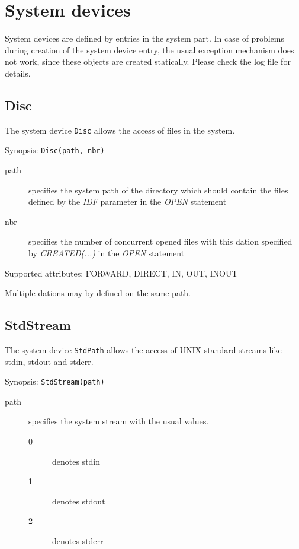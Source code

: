 \section{System devices}
\label{x8632devices}

System devices are defined by entries in the system part.
In case of problems during creation of the system device entry, the
usual exception mechanism does not work, since these objects are created
statically. Please check the log file for details.

\subsection{Disc}
The system device \verb|Disc| allows the access of files in the system.

Synopsis: \verb|Disc(path, nbr)|

\begin{description}
\item [path] specifies the system path of the directory which should contain
    the files defined by the {\em IDF} parameter in the {\em OPEN} statement
\item[nbr] specifies the number of concurrent opened files with this dation
     specified by {\em CREATED(...)} in the {\em OPEN} statement
\end{description}

Supported attributes: FORWARD, DIRECT, IN, OUT, INOUT

Multiple dations may by defined on the same path.

\subsection{StdStream}
The system device \verb|StdPath| allows the access of UNIX standard streams
like stdin, stdout and stderr.

Synopsis: \verb|StdStream(path)|

\begin{description}
\item [path] specifies the system stream with the usual values. 
   \begin{description}
    \item [0] denotes stdin
    \item [1] denotes stdout
    \item [2] denotes stderr
   \end{description}
\end{description}

